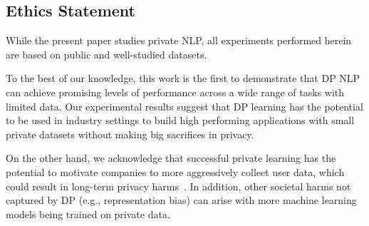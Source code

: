\subsection*{Ethics Statement}
While the present paper studies private NLP, all experiments performed herein are based on public and well-studied datasets. 

To the best of our knowledge, this work is the first to demonstrate that DP NLP can achieve promising levels of performance across a wide range of tasks with limited data. 
Our experimental results suggest that DP learning has the potential to be used in industry settings to build high performing applications with small private datasets without making big sacrifices in privacy.

On the other hand, we acknowledge that successful private learning has the potential to motivate companies to more aggressively collect user data, which could result in long-term privacy harms~\citep{rogaway2015moral,solove2005taxonomy}.
In addition, other societal harms not captured by DP (e.g., representation bias) can arise with more machine learning models being trained on private data.


